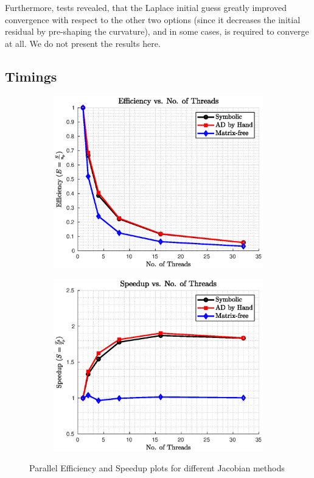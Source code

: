 \documentclass[11pt]{scrartcl}
\begin{document}
Furthermore, tests revealed, that the Laplace initial guess greatly improved convergence with respect to the other two options (since it decreases the initial residual by pre-shaping the curvature), and in some cases, is required to converge at all. We do not present the results here.


\clearpage
\subsection{Timings}\label{sec:tim}

\begin{figure}[H]
	\centering
	\begin{subfigure}[b]{0.48\linewidth}
		\includegraphics[width=\linewidth]{./figs/efficiency.eps}
	\end{subfigure}
	\begin{subfigure}[b]{0.48\linewidth}
		\includegraphics[width=\linewidth]{./figs/speedup.eps}
	\end{subfigure}
	\caption{Parallel Efficiency and Speedup plots for different Jacobian methods}\label{fig: Timing}
\end{figure}
\end{document}
